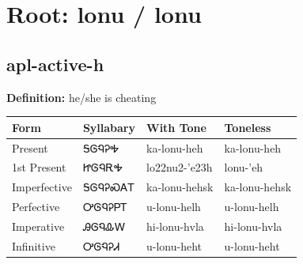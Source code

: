 \documentclass{article}%
\begin{document}
%
\normalsize%
\section*{Root: lonu / lonu}%
\subsection*{apl-active-h}%
\textbf{Definition: }%
he/she is cheating%
\\[0.5em]%
\begin{tabular}{|l|l|l|l|}%
\hline%
\textbf{Form}&\textbf{Syllabary}&\textbf{With Tone}&\textbf{Toneless}\\%
\hline%
Present&ᎦᎶᏄᎮᎭ&ka{-}lonu{-}heh&ka{-}lonu{-}heh\\%
1st Present&ᏥᎶᏄᎡᎭ&lo22nu2{-}'e23h&lonu{-}'eh\\%
Imperfective&ᎦᎶᏄᎮᏍᎪᎢ&ka{-}lonu{-}hehsk&ka{-}lonu{-}hehsk\\%
Perfective&ᎤᎶᏄᎮᏢᎢ&u{-}lonu{-}helh&u{-}lonu{-}helh\\%
Imperative&ᎯᎶᏄᎲᎳ&hi{-}lonu{-}hvla&hi{-}lonu{-}hvla\\%
Infinitive&ᎤᎶᏄᎮᏗ&u{-}lonu{-}heht&u{-}lonu{-}heht\\%
\hline%
\end{tabular}%
\\[1em]%
\end{document}
